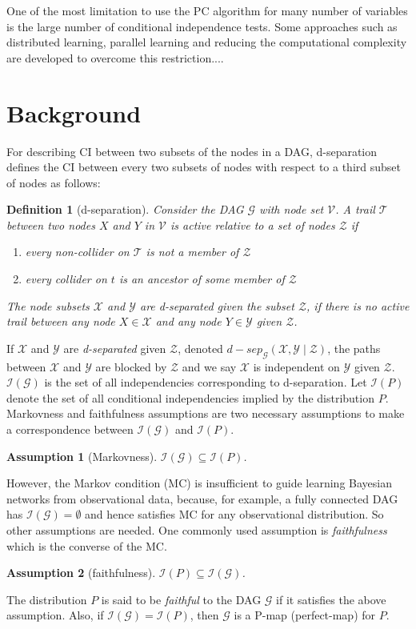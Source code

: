 \documentclass{article}
\newtheorem{definition}{Definition}
\newtheorem{assumption}{Assumption}
\newcommand{\I}{\mathcal{I}}
\newcommand{\Y}{\mathcal{Y}}
\newcommand{\Z}{\mathcal{Z}}
\newcommand{\X}{\mathcal{X}}
\newcommand{\V}{\mathcal{V}}
\newcommand{\T}{\mathcal{T}}
\newcommand{\G}{\mathcal{G}}
\begin{document}
One of the most limitation to use the PC algorithm for many number of variables is the large number of conditional independence tests. 
Some approaches such as distributed learning, parallel learning and reducing the computational complexity are developed to overcome this restriction....

\section{Background}
For describing CI between two subsets of the nodes in a DAG, d-separation defines the CI between every two subsets of nodes with respect to a third subset of nodes as follows:
\begin{definition} [d-separation] \label{definition_d-separation}
    Consider the DAG $\G$ with node set $\V$.
    A trail $\T$ between two nodes $X$ and $Y$ in $\V$ is \emph{active} relative to a set of nodes $\Z$ if 
    \begin{enumerate}
    	\item every non-collider on $\T$ is not a member of $\Z$
    	\item every collider on $t$ is an ancestor of some member of $\Z$
    \end{enumerate}
    The node subsets $\X$ and $\Y$ are \emph{d-separated} given the subset $\Z$, if there is no active
    trail between any node $X \in \X$ and any node $Y \in \Y$ given $\Z$.

\end{definition}
If $\X$ and $\Y$ are \emph{d-separated} given $\Z$, denoted $d-sep_{\G}(\X,\Y \mid \Z )$, the paths between $\X$ and $\Y$ are blocked by $\Z$ and we say $\X$ is independent on $\Y$ given $\Z$. $\I (\G)$ is the set of all independencies corresponding to d-separation.
Let $\I(P)$ denote the set of all conditional independencies implied by the distribution $P$.
Markovness and faithfulness assumptions are two necessary assumptions to make a correspondence between $\I (\G)$ and $\I (P)$.
\begin{assumption}[Markovness] \label{assumption_Markovness}
    $\I(\G)\subseteq \I(P)$.
\end{assumption}
However, the Markov condition (MC) is insufficient to guide learning Bayesian networks from observational data, because, for example, a fully connected DAG has $\I(\G)=\emptyset$ and hence satisfies MC for any observational distribution.
So other assumptions are needed. 
One commonly used assumption is \emph{faithfulness} which is the converse of the MC. 
\begin{assumption}[faithfulness] \label{assumption_faithfulness}
    $\mathcal{I}(P) \subseteq \mathcal{I}(\mathcal{G})$.
\end{assumption}
The distribution $P$ is said to be \emph{ faithful} to the DAG $\G$ if it satisfies the above assumption. Also, if $\I(\G) = \I(P)$, then $\G$ is a P-map (perfect-map) for $P$. 
\end{document}
